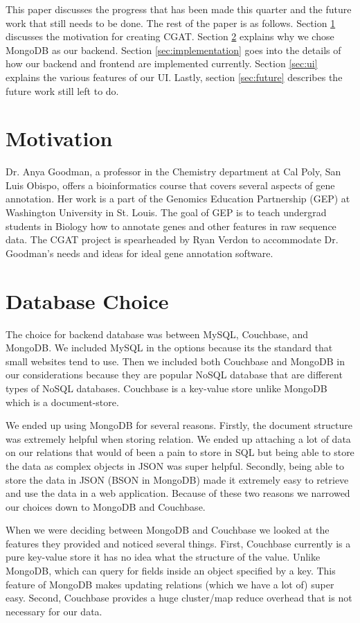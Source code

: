 \documentclass[10pt, conference, compsocconf]{IEEEtran}
\begin{document}
This paper discusses the progress that has been made this quarter and the future work that 
still needs to be done. The rest of the paper is as follows. Section \ref{sec:motive} discusses the
motivation for creating CGAT. Section \ref{sec:choice} explains why we chose MongoDB
as our backend. Section \ref{sec:implementation} goes into the details of how
our backend and frontend are implemented currently. Section \ref{sec:ui} explains the
various features of our UI. Lastly, section \ref{sec:future} describes the future work still left to
do.

\section{Motivation}\label{sec:motive}
Dr. Anya Goodman, a professor in the Chemistry department at Cal Poly, San Luis
Obispo, offers a bioinformatics course that covers several aspects of gene
annotation. Her work is a part of the Genomics Education Partnership (GEP) at 
Washington University in St. Louis.\cite{gep} The goal of GEP is to teach undergrad students
in Biology how to annotate genes and other features in raw sequence data.
The CGAT project is spearheaded by Ryan Verdon to accommodate Dr.
Goodman's needs and ideas for ideal gene annotation software.

\section{Database Choice}\label{sec:choice}
The choice for backend database was between MySQL, Couchbase, and MongoDB.
We included MySQL in the options because its the standard that small websites tend to use. Then we included both
Couchbase and MongoDB in our considerations because they are popular NoSQL database that are different types of NoSQL
databases. Couchbase is a key-value store unlike MongoDB which is a document-store.

We ended up using MongoDB for several reasons. Firstly, the document structure was extremely helpful when storing
relation. We ended up attaching a lot of data on our relations that would of been a pain to store in SQL but being
able to store the data as complex objects in JSON was super helpful. Secondly, being able to store the data in JSON
(BSON in MongoDB) made it extremely easy to retrieve and use the data in a web application. Because of these two reasons
we narrowed our choices down to MongoDB and Couchbase. 

When we were deciding between MongoDB and Couchbase we looked at the features they 
provided and noticed several things. First, Couchbase currently is a pure key-value store it has
no idea what the structure of the value. Unlike MongoDB, which can query for fields inside an 
object specified by a key. This feature of MongoDB makes updating relations (which we 
have a lot of) super easy. Second, Couchbase provides a huge
cluster/map reduce overhead that is not necessary for our data. 
\end{document}

